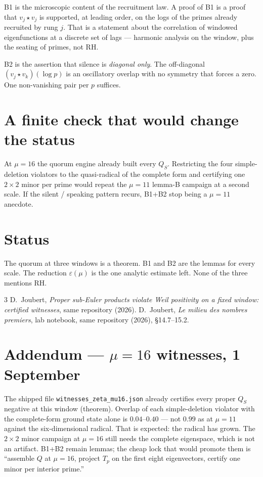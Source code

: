 \documentclass[10pt]{article}
\begin{document}
B1 is the microscopic content of the recruitment law. A proof of B1
is a proof that $v_j\star v_j$ is supported, at leading order, on the
logs of the primes already recruited by rung $j$. That is a statement
about the correlation of windowed eigenfunctions at a discrete set of
lags --- harmonic analysis on the window, plus the seating of primes,
not RH.

B2 is the assertion that silence is \emph{diagonal only}. The
off-diagonal $(v_j\star v_k)(\log p)$ is an oscillatory overlap with
no symmetry that forces a zero. One non-vanishing pair per $p$
suffices.

\section{A finite check that would change the status}

At $\mu=16$ the quorum engine already built every $Q_S$. Restricting
the four simple-deletion violators to the quasi-radical of the
complete form and certifying one $2\times2$ minor per prime would
repeat the $\mu=11$ lemma-B campaign at a second scale. If the silent
/ speaking pattern recurs, B1+B2 stop being a $\mu=11$ anecdote.

\section{Status}

The quorum at three windows is a theorem. B1 and B2 are the lemmas
for every scale. The reduction $\varepsilon(\mu)$ is the one analytic
estimate left. None of the three mentions RH.

\begin{thebibliography}{3}\small
{} D.~Joubert, \emph{Proper sub-Euler products violate
Weil positivity on a fixed window: certified witnesses}, same
repository (2026).
 D.~Joubert, \emph{Le milieu des nombres premiers}, lab
notebook, same repository (2026), \S14.7--15.2.
\end{thebibliography}

\section*{Addendum --- $\mu=16$ witnesses, 1 September}

The shipped file \texttt{witnesses\_zeta\_mu16.json} already certifies
every proper $Q_S$ negative at this window (theorem). Overlap of each
simple-deletion violator with the complete-form ground state alone is
$0.04$--$0.40$ --- not $0.99$ as at $\mu=11$ against the six-dimensional
radical. That is expected: the radical has grown. The $2\times2$ minor
campaign at $\mu=16$ still needs the complete eigenspace, which is not
an artifact. B1+B2 remain lemmas; the cheap lock that would promote
them is ``assemble $Q$ at $\mu=16$, project $T_p$ on the first eight
eigenvectors, certify one minor per interior prime.''
\end{document}
